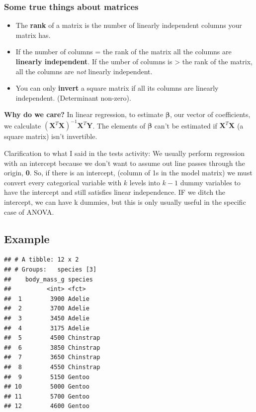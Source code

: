 \documentclass[
  openany]{book}
\providecommand{\tightlist}{%
  \setlength{\itemsep}{0pt}\setlength{\parskip}{0pt}}
\begin{document}
\hypertarget{some-true-things-about-matrices}{%
\subsubsection{Some true things about matrices}\label{some-true-things-about-matrices}}

\begin{itemize}
\tightlist
\item
  The \textbf{rank} of a matrix is the number of linearly independent columns your matrix has.\\
\item
  If the number of columns = the rank of the matrix all the columns are \textbf{linearly independent}. If the umber of columns is \textgreater{} the rank of the matrix, all the columns are \emph{not} linearly independent.\\
\item
  You can only \textbf{invert} a square matrix if all its columns are linearly independent. (Determinant non-zero).
\end{itemize}

\textbf{Why do we care?} In linear regression, to estimate \(\boldsymbol\beta\), our vector of coefficients, we calculate \((\boldsymbol X^T\boldsymbol X)^{-1}\boldsymbol X^T\boldsymbol Y\). The elements of \(\boldsymbol\beta\) can't be estimated if \(\boldsymbol X^T\boldsymbol X\) (a square matrix) isn't invertible.

Clarification to what I said in the tests activity: We usually perform regression with an intercept because we don't want to assume out line passes through the origin, \textbf{0}. So, if there is an intercept, (column of 1s in the model matrix) we must convert every categorical variable with \(k\) levels into \(k-1\) dummy variables to have the intercept and still satisfies linear independence. IF we ditch the intercept, we can have k dummies, but this is only usually useful in the specific case of ANOVA.

\hypertarget{example-3}{%
\subsection{Example}\label{example-3}}

\begin{verbatim}
## # A tibble: 12 x 2
## # Groups:   species [3]
##    body_mass_g species  
##          <int> <fct>    
##  1        3900 Adelie   
##  2        3700 Adelie   
##  3        3450 Adelie   
##  4        3175 Adelie   
##  5        4500 Chinstrap
##  6        3850 Chinstrap
##  7        3650 Chinstrap
##  8        4550 Chinstrap
##  9        5150 Gentoo   
## 10        5000 Gentoo   
## 11        5700 Gentoo   
## 12        4600 Gentoo
\end{verbatim}
\end{document}

